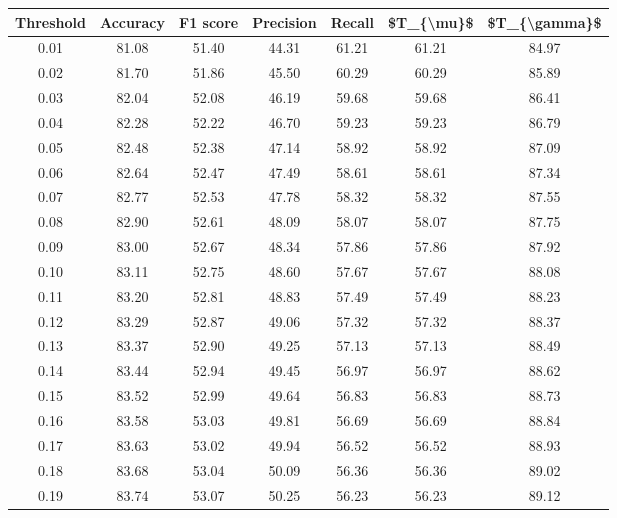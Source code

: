 \begin{tabular}{|c|c|c|c|c|c|c|}
\hline
 Threshold &  Accuracy &  F1 score &  Precision &  Recall &  \$T\_\{\textbackslash mu\}\$ &  \$T\_\{\textbackslash gamma\}\$ \\
\hline
      0.01 &     81.08 &     51.40 &      44.31 &   61.21 &      61.21 &         84.97 \\
      0.02 &     81.70 &     51.86 &      45.50 &   60.29 &      60.29 &         85.89 \\
      0.03 &     82.04 &     52.08 &      46.19 &   59.68 &      59.68 &         86.41 \\
      0.04 &     82.28 &     52.22 &      46.70 &   59.23 &      59.23 &         86.79 \\
      0.05 &     82.48 &     52.38 &      47.14 &   58.92 &      58.92 &         87.09 \\
      0.06 &     82.64 &     52.47 &      47.49 &   58.61 &      58.61 &         87.34 \\
      0.07 &     82.77 &     52.53 &      47.78 &   58.32 &      58.32 &         87.55 \\
      0.08 &     82.90 &     52.61 &      48.09 &   58.07 &      58.07 &         87.75 \\
      0.09 &     83.00 &     52.67 &      48.34 &   57.86 &      57.86 &         87.92 \\
      0.10 &     83.11 &     52.75 &      48.60 &   57.67 &      57.67 &         88.08 \\
      0.11 &     83.20 &     52.81 &      48.83 &   57.49 &      57.49 &         88.23 \\
      0.12 &     83.29 &     52.87 &      49.06 &   57.32 &      57.32 &         88.37 \\
      0.13 &     83.37 &     52.90 &      49.25 &   57.13 &      57.13 &         88.49 \\
      0.14 &     83.44 &     52.94 &      49.45 &   56.97 &      56.97 &         88.62 \\
      0.15 &     83.52 &     52.99 &      49.64 &   56.83 &      56.83 &         88.73 \\
      0.16 &     83.58 &     53.03 &      49.81 &   56.69 &      56.69 &         88.84 \\
      0.17 &     83.63 &     53.02 &      49.94 &   56.52 &      56.52 &         88.93 \\
      0.18 &     83.68 &     53.04 &      50.09 &   56.36 &      56.36 &         89.02 \\
      0.19 &     83.74 &     53.07 &      50.25 &   56.23 &      56.23 &         89.12 \\

\end{tabular}
